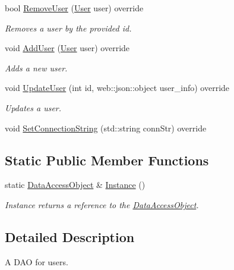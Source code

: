\begin{DoxyCompactItemize}
bool \mbox{\hyperlink{classcadg__rest_1_1_data_access_object_a049df84fde79be3547fe363be40850e4}{Remove\+User}} (\mbox{\hyperlink{structcadg__rest_1_1_user}{User}} user) override
\begin{DoxyCompactList}\small\item\em Removes a user by the provided id. \end{DoxyCompactList}\item 
void \mbox{\hyperlink{classcadg__rest_1_1_data_access_object_a6d80c563e1cd526791fa69f32cd1d896}{Add\+User}} (\mbox{\hyperlink{structcadg__rest_1_1_user}{User}} user) override
\begin{DoxyCompactList}\small\item\em Adds a new user. \end{DoxyCompactList}\item 
void \mbox{\hyperlink{classcadg__rest_1_1_data_access_object_af9a88b06de9cd2c7042c91be83e00872}{Update\+User}} (int id, web\+::json\+::object user\+\_\+info) override
\begin{DoxyCompactList}\small\item\em Updates a user. \end{DoxyCompactList}\item 
void \mbox{\hyperlink{classcadg__rest_1_1_data_access_object_a9f5981fb13220932808b46fee7b55398}{Set\+Connection\+String}} (std\+::string conn\+Str) override
\end{DoxyCompactItemize}
\subsection*{Static Public Member Functions}
\begin{DoxyCompactItemize}
\item 
static \mbox{\hyperlink{classcadg__rest_1_1_data_access_object}{Data\+Access\+Object}} \& \mbox{\hyperlink{classcadg__rest_1_1_data_access_object_a7daee562f5c70bfe2ad1989115f8f97e}{Instance}} ()
\begin{DoxyCompactList}\small\item\em Instance returns a reference to the \mbox{\hyperlink{classcadg__rest_1_1_data_access_object}{Data\+Access\+Object}}. \end{DoxyCompactList}\end{DoxyCompactItemize}


\subsection{Detailed Description}
A D\+AO for users. 

